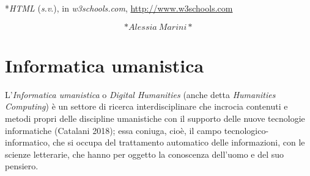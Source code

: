 \documentclass[
  b5paper,
  twoside,
  12pt,
  chapterprefix=false,
  bibliography=totocnumbered,
  parskip=false]{scrbook}
\begin{document}
*\emph{HTML} (\emph{s.v}.), in \emph{w3schools.com},
\url{http://www.w3schools.com}

\[*Alessia~Marini*\]

\hypertarget{informatica-umanistica}{%
\chapter{Informatica umanistica}\label{informatica-umanistica}}

L'\emph{Informatica umanistica} o \emph{Digital Humanities} (anche detta
\emph{Humanities Computing}) è un settore di ricerca interdisciplinare che
incrocia contenuti e metodi propri delle discipline umanistiche con il
supporto delle nuove tecnologie informatiche (Catalani 2018); essa
coniuga, cioè, il campo tecnologico-informatico, che si occupa del
trattamento automatico delle informazioni, con le scienze letterarie,
che hanno per oggetto la conoscenza dell'uomo e del suo pensiero.
\end{document}

